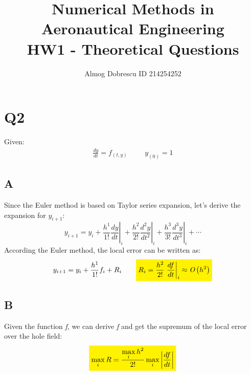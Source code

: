 \documentclass[11pt, a4paper]{article}
\title{Numerical Methods in Aeronautical Engineering \\ HW1 - Theoretical Questions}
\author{Almog Dobrescu ID 214254252}
\begin{document}
\maketitle
\thispagestyle{empty}
\newpage


\tableofcontents
\newpage

\pagestyle{fancy}
\setcounter{page}{1}

\section{Q2}
Given: 
\begin{equation}
    \begin{matrix}
        \displaystyle\frac{dy}{dt}=f_{\left(t,y\right)} &&& \displaystyle y_{\left(0\right)}=1
    \end{matrix}
\end{equation}

\subsection{A}
Since the Euler method is based on Taylor series expansion, let's derive the expansion for $y_{i+1}$:
\begin{equation}
    y_{i+1}=y_i+\left.\frac{h^1}{1!}\frac{dy}{dt}\right|_i+\left.\frac{h^2}{2!}\frac{d^2y}{dt^2}\right|_i+\left.\frac{h^3}{3!}\frac{d^3y}{dt^3}\right|_i+\cdots
\end{equation}
According the Euler method, the local error can be written as:
\begin{equation}
    \begin{matrix}
        \displaystyle y_{i+1}=y_i+\frac{h^1}{1!}f_i+R_i && \colorbox{yellow}{$\displaystyle R_i=\frac{h^2}{2!}\left.\frac{df}{dt}\right|_i\approx\emph{O}\left(h^2\right)$}
    \end{matrix}
\end{equation}

\subsection{B}
Given the function \emph{f}, we can derive \emph{f} and get the supremum of the local error over the hole field:
\begin{equation}
    \colorbox{yellow}{$\displaystyle\max_i{R}=\frac{\displaystyle\max_i{h^2}}{2!}\max_i{\left|\frac{df}{dt}\right|}$}
\end{equation}
\end{document}
